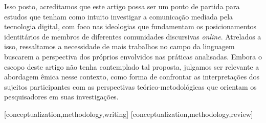 \documentclass[portuguese]{textolivre}
\begin{document}
Isso posto, acreditamos que este artigo possa ser um ponto de partida para estudos que tenham como intuito investigar a comunicação mediada pela tecnologia digital, com foco nas ideologias que fundamentam os posicionamentos identitários de membros de diferentes comunidades discursivas \textit{online}. Atrelados a isso, ressaltamos a necessidade de mais trabalhos no campo da linguagem buscarem a perspectiva dos próprios envolvidos nas práticas analisadas. Embora o escopo deste artigo não tenha contemplado tal proposta, julgamos ser relevante a abordagem êmica nesse contexto, como forma de confrontar as interpretações dos sujeitos participantes com as perspectivas teórico-metodológicas que orientam os pesquisadores em suas investigações.


\printbibliography\label{sec-bib}


\begin{contributors}
[conceptualization,methodology,writing]
[conceptualization,methodology,review]
\end{contributors}
\end{document}
